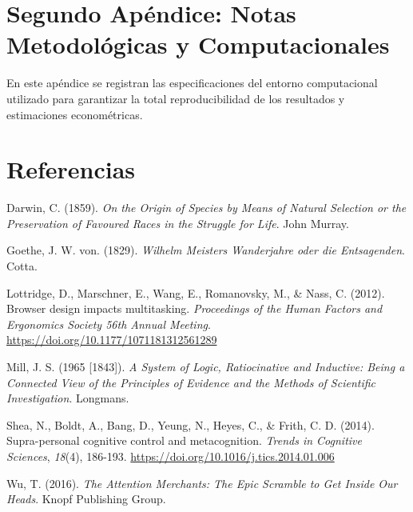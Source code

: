 \documentclass[a4paper, nobind]{templates/ociamthesis}
\newlength{\cslhangindent}
\newenvironment{CSLReferences}[2] %
 {\begin{list}{}{%
  \setlength{\itemindent}{0pt}
  \setlength{\leftmargin}{0pt}
  \setlength{\parsep}{0pt}
  \ifodd #1
  \setlength{\leftmargin}{\cslhangindent}
  \setlength{\itemindent}{-1\cslhangindent}
  \fi
  \setlength{\itemsep}{#2\baselineskip}}}
 {\end{list}}
\begin{document}
\chapter{Segundo Apéndice: Notas Metodológicas y Computacionales}\label{segundo-apuxe9ndice-notas-metodoluxf3gicas-y-computacionales}

En este apéndice se registran las especificaciones del entorno computacional utilizado para garantizar la total reproducibilidad de los resultados y estimaciones econométricas.

\chapter*{Referencias}\label{referencias}

\protect{}\label{refs}
\begin{CSLReferences}{1}{0}
Darwin, C. (1859). \emph{{On the Origin of Species by Means of Natural Selection or the Preservation of Favoured Races in the Struggle for Life}}. John Murray.

Goethe, J. W. von. (1829). \emph{Wilhelm {Meisters} {Wanderjahre} oder die {Entsagenden}}. Cotta.

Lottridge, D., Marschner, E., Wang, E., Romanovsky, M., \& Nass, C. (2012). {Browser design impacts multitasking}. \emph{Proceedings of the Human Factors and Ergonomics Society 56th Annual Meeting}. \url{https://doi.org/10.1177/1071181312561289}

Mill, J. S. (1965 {[}1843{]}). \emph{A System of Logic, Ratiocinative and Inductive: Being a Connected View of the Principles of Evidence and the Methods of Scientific Investigation}. Longmans.

Shea, N., Boldt, A., Bang, D., Yeung, N., Heyes, C., \& Frith, C. D. (2014). {Supra-personal cognitive control and metacognition}. \emph{Trends in Cognitive Sciences}, \emph{18}(4), 186-193. \url{https://doi.org/10.1016/j.tics.2014.01.006}

Wu, T. (2016). \emph{{The Attention Merchants: The Epic Scramble to Get Inside Our Heads}}. Knopf Publishing Group.

\end{CSLReferences}

\end{document}
